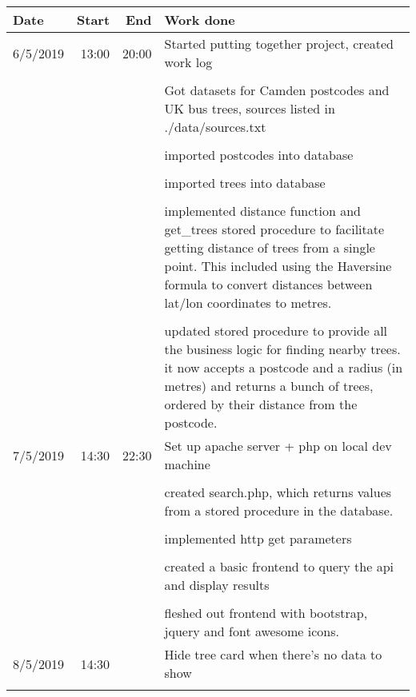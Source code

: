 \documentclass{article}
\begin{document}
\begin{table}[h!]
    \begin{tabular}{l|r|r|p{15cm}}  %
        \textbf{Date} & \textbf{Start} & \textbf{End} & \textbf{Work done} \\
        \hline
        6/5/2019    &   13:00   &   20:00   &   Started putting together project, created work log\\
        &   &   &   \\
        &   &                               &   Got datasets for Camden postcodes and UK bus trees, sources listed in ./data/sources.txt \\
        &   &   &   \\
        &   &                               &   imported postcodes into database \\
        &   &   &   \\
        &   &                               &   imported trees into database \\
        &   &   &   \\
        &   &                               &   implemented distance function and get\_trees stored procedure to facilitate getting distance of trees from a single point. This included using the Haversine formula to convert distances between lat/lon coordinates to metres.  \\
        &   &   &   \\
        &   &                               &   updated stored procedure to provide all the business logic for finding nearby trees. it now accepts a postcode and a radius (in metres) and returns a bunch of trees, ordered by their distance from the postcode. \\
        \hline
        7/5/2019    &   14:30   &   22:30   &   Set up apache server + php on local dev machine\\
        &   &   &   \\
        &   &                               &   created search.php, which returns values from a stored procedure in the database.\\
        &   &   &   \\
        &   &                               &   implemented http get parameters\\
        &   &   &   \\
        &   &                               &   created a basic frontend to query the api and display results\\
        &   &   &   \\
        &   &                               &   fleshed out frontend with bootstrap, jquery and font awesome icons.\\
        \hline
        8/5/2019    &   14:30   &           &   Hide tree card when there's no data to show\\
        &   &   &   \\
    \end{tabular}
\end{table}
\end{document}
